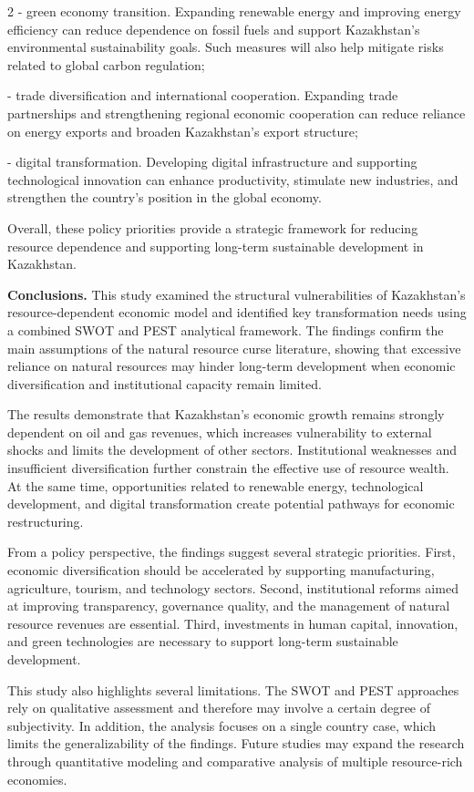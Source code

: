 \begin{multicols}{2}
- green economy transition. Expanding renewable energy and improving
energy efficiency can reduce dependence on fossil fuels and support
Kazakhstan's environmental sustainability goals. Such measures will also
help mitigate risks related to global carbon regulation;

- trade diversification and international cooperation. Expanding trade
partnerships and strengthening regional economic cooperation can reduce
reliance on energy exports and broaden Kazakhstan's export structure;

- digital transformation. Developing digital infrastructure and
supporting technological innovation can enhance productivity, stimulate
new industries, and strengthen the country's position in the global
economy.

Overall, these policy priorities provide a strategic framework for
reducing resource dependence and supporting long-term sustainable
development in Kazakhstan.

{\bfseries Conclusions.} This study examined the structural vulnerabilities
of Kazakhstan's resource-dependent economic model and identified key
transformation needs using a combined SWOT and PEST analytical
framework. The findings confirm the main assumptions of the natural
resource curse literature, showing that excessive reliance on natural
resources may hinder long-term development when economic diversification
and institutional capacity remain limited.

The results demonstrate that Kazakhstan's economic growth remains
strongly dependent on oil and gas revenues, which increases
vulnerability to external shocks and limits the development of other
sectors. Institutional weaknesses and insufficient diversification
further constrain the effective use of resource wealth. At the same
time, opportunities related to renewable energy, technological
development, and digital transformation create potential pathways for
economic restructuring.

From a policy perspective, the findings suggest several strategic
priorities. First, economic diversification should be accelerated by
supporting manufacturing, agriculture, tourism, and technology sectors.
Second, institutional reforms aimed at improving transparency,
governance quality, and the management of natural resource revenues are
essential. Third, investments in human capital, innovation, and green
technologies are necessary to support long-term sustainable development.

This study also highlights several limitations. The SWOT and PEST
approaches rely on qualitative assessment and therefore may involve a
certain degree of subjectivity. In addition, the analysis focuses on a
single country case, which limits the generalizability of the findings.
Future studies may expand the research through quantitative modeling and
comparative analysis of multiple resource-rich economies.


\end{multicols}
